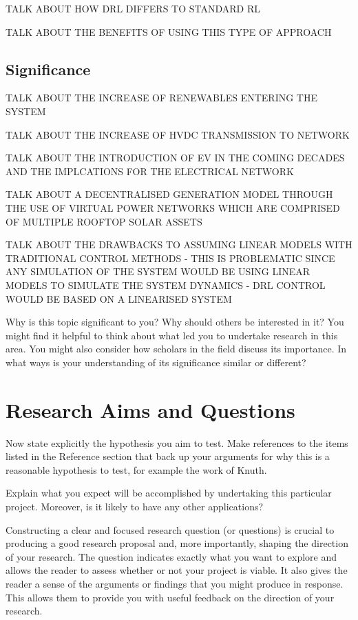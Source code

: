\documentclass[12pt, a4paper]{article}
\begin{document}
TALK ABOUT HOW DRL DIFFERS TO STANDARD RL

TALK ABOUT THE BENEFITS OF USING THIS TYPE OF APPROACH


\subsection{Significance}

TALK ABOUT THE INCREASE OF RENEWABLES ENTERING THE SYSTEM

TALK ABOUT THE INCREASE OF HVDC TRANSMISSION TO NETWORK

TALK ABOUT THE INTRODUCTION OF EV IN THE COMING DECADES AND THE IMPLCATIONS FOR THE ELECTRICAL NETWORK

TALK ABOUT A DECENTRALISED GENERATION MODEL THROUGH THE USE OF VIRTUAL POWER NETWORKS WHICH ARE COMPRISED OF MULTIPLE ROOFTOP SOLAR ASSETS

TALK ABOUT THE DRAWBACKS TO ASSUMING LINEAR MODELS WITH TRADITIONAL CONTROL METHODS - THIS IS PROBLEMATIC SINCE ANY SIMULATION OF THE SYSTEM WOULD BE USING LINEAR MODELS TO SIMULATE THE SYSTEM DYNAMICS - DRL CONTROL WOULD BE BASED ON A LINEARISED SYSTEM

Why is this topic significant to you? Why should others be interested in it? You might find it helpful to think about what led you to undertake research in this area. You might also consider how scholars in the field discuss its importance. In what ways is your understanding of its significance similar or different?


\section{Research Aims and Questions}
Now state explicitly the hypothesis you aim to test. Make references to the items listed in the Reference section that back up your arguments for why this is a reasonable hypothesis to test, for example the work of Knuth.

Explain what you expect will be accomplished by undertaking this particular project.  Moreover, is it likely to have any other applications?

Constructing a clear and focused research question (or questions) is crucial to producing a good research proposal and, more importantly, shaping the direction of your research. The question indicates exactly what you want to explore and allows the reader to assess whether or not your project is viable. It also gives the reader a sense of the arguments or findings that you might produce in response. This allows them to provide you with useful feedback on the direction of your research.
\end{document}
